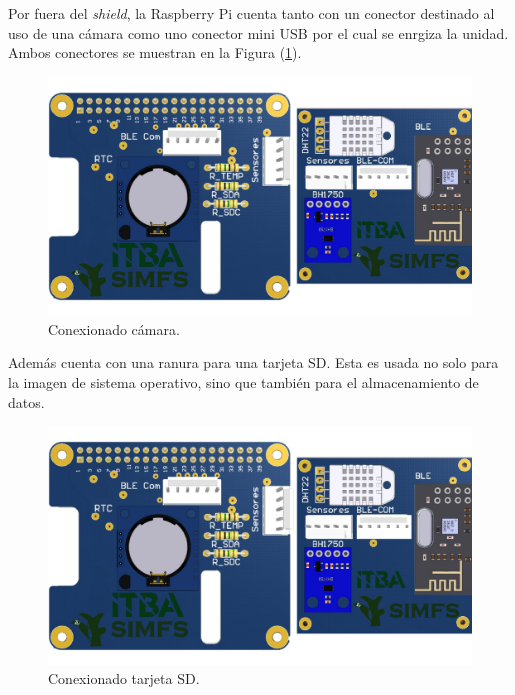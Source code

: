 Por fuera del \textit{shield}, la Raspberry Pi cuenta tanto con un conector destinado al uso de una cámara como uno conector mini USB por el cual se enrgiza la unidad. Ambos conectores se muestran en la Figura (\ref{fig:rpiFront}).
\begin{figure}[H]
	\centering
	\includegraphics[width=\linewidth,page=3]{ImagenesIngenieria de Detalle/RPI}		
	\caption{Conexionado cámara.}
	\label{fig:rpiFront}
\end{figure}

Además cuenta con una ranura para una tarjeta SD. Esta es usada no solo para la imagen de sistema operativo, sino que también para el almacenamiento de datos.
\begin{figure}[H]
	\centering
	\includegraphics[width=0.9\linewidth,page=2]{ImagenesIngenieria de Detalle/RPI}		
	\caption{Conexionado tarjeta SD.}
	\label{fig:rpiBack}
\end{figure}
